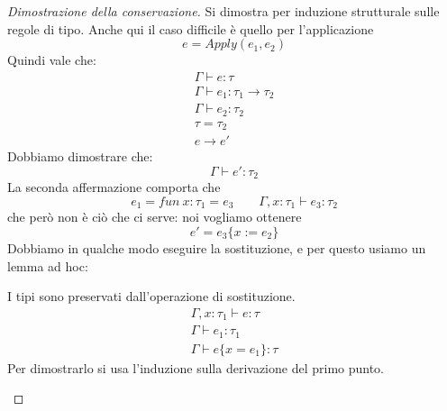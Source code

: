 \begin{proof}[Dimostrazione della conservazione]
	Si dimostra per induzione strutturale sulle regole di tipo. Anche qui il caso difficile è quello per l'applicazione
	\begin{equation*}
		e = Apply(e_1,e_2)
	\end{equation*}
	Quindi vale che:
	\begin{gather*}
		\Gamma \vdash e : \tau \\
		\Gamma \vdash e_1 : \tau_1 \rightarrow \tau_2 \\
		\Gamma \vdash e_2  : \tau_2 \\
		\tau = \tau_2 \\
		e \rightarrow e'
	\end{gather*}
	Dobbiamo dimostrare che:
	\begin{equation*}
		\Gamma \vdash e':\tau_2
	\end{equation*}
	La seconda affermazione comporta che
	\begin{equation*}
		e_1 = fun \: x : \tau_1 = e_3 \qquad \Gamma,x:\tau_1 \vdash e_3:\tau_2
	\end{equation*}
	che però non è ciò che  ci serve: noi vogliamo ottenere
	\begin{equation*}
		e' = e_3 \{x:=e_2\}
	\end{equation*}
	Dobbiamo in qualche modo eseguire la sostituzione, e per questo usiamo un lemma ad hoc:
	\begin{lemma}
		I tipi sono preservati dall'operazione di sostituzione.
		\begin{gather*}
			\Gamma,x:\tau_1 \vdash e:\tau \\
			\Gamma \vdash e_1:\tau_1 \\
			\Gamma \vdash e\{x=e_1\}:\tau
		\end{gather*}
		Per dimostrarlo si usa l'induzione sulla derivazione del primo punto.
	\end{lemma}
\end{proof}
